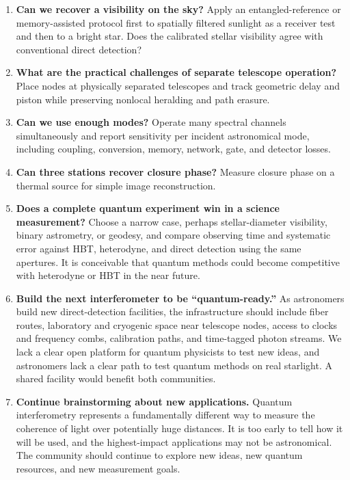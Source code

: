 \documentclass[]{spie}
\begin{document}
\begin{enumerate}[leftmargin=*,itemsep=3pt]
    \item \textbf{Can we recover a visibility on the sky?} Apply an entangled-reference or memory-assisted protocol first to spatially filtered sunlight as a receiver test and then to a bright star. Does the calibrated stellar visibility agree with conventional direct detection?
    \item \textbf{What are the practical challenges of separate telescope operation?} Place nodes at physically separated telescopes and track geometric delay and piston while preserving nonlocal heralding and path erasure.
    \item \textbf{Can we use enough modes?} Operate many spectral channels simultaneously and report sensitivity per incident astronomical mode, including coupling, conversion, memory, network, gate, and detector losses.
    \item \textbf{Can three stations recover closure phase?} Measure closure phase on a thermal source for simple image reconstruction.
    \item \textbf{Does a complete quantum experiment win in a science measurement?} Choose a narrow case, perhaps stellar-diameter visibility, binary astrometry, or geodesy, and compare observing time and systematic error against HBT, heterodyne, and direct detection using the same apertures. It is conceivable that quantum methods could become competitive with heterodyne or HBT in the near future.
    \item \textbf{Build the next interferometer to be ``quantum-ready.''} As astronomers build new direct-detection facilities, the infrastructure should include fiber routes, laboratory and cryogenic space near telescope nodes, access to clocks and frequency combs, calibration paths, and time-tagged photon streams. We lack a clear open platform for quantum physicists to test new ideas, and astronomers lack a clear path to test quantum methods on real starlight. A shared facility would benefit both communities.
    \item \textbf{Continue brainstorming about new applications.} Quantum interferometry represents a fundamentally different way to measure the coherence of light over potentially huge distances. It is too early to tell how it will be used, and the highest-impact applications may not be astronomical. The community should continue to explore new ideas, new quantum resources, and new measurement goals.
\end{enumerate}
\end{document}
